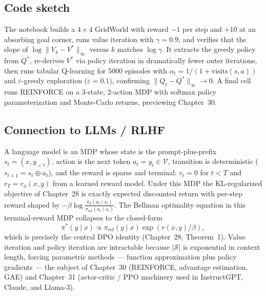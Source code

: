 \subsection*{Code sketch}

The notebook builds a $4{\times}4$ GridWorld with reward $-1$ per step and $+10$ at an absorbing goal corner, runs value iteration with $\gamma = 0.9$, and verifies that the slope of $\log \|V_k - V^*\|_\infty$ versus $k$ matches $\log\gamma$. It extracts the greedy policy from $Q^*$, re-derives $V^*$ via policy iteration in dramatically fewer outer iterations, then runs tabular Q-learning for 5000 episodes with $\alpha_t = 1/(1+\mathrm{visits}(s,a))$ and $\varepsilon$-greedy exploration ($\varepsilon=0.1$), confirming $\|Q_t - Q^*\|_\infty \to 0$. A final cell runs REINFORCE on a 3-state, 2-action MDP with softmax policy parameterization and Monte-Carlo returns, previewing Chapter~30.

\subsection*{Connection to LLMs / RLHF}

A language model is an MDP whose state is the prompt-plus-prefix $s_t = (x, y_{<t})$, action is the next token $a_t = y_t \in \mathcal{V}$, transition is deterministic ($s_{t+1} = s_t \oplus a_t$), and the reward is sparse and terminal: $r_t = 0$ for $t<T$ and $r_T = r_\phi(x,y)$ from a learned reward model. Under this MDP the KL-regularized objective of Chapter~28 is exactly expected discounted return with per-step reward shaped by $-\beta \log\frac{\pi_\theta(a_t\mid s_t)}{\pi_{\mathrm{ref}}(a_t\mid s_t)}$. The Bellman optimality equation in this terminal-reward MDP collapses to the closed-form
\[
\pi^*(y\mid x) \propto \pi_{\mathrm{ref}}(y\mid x)\exp(r(x,y)/\beta),
\]
which is precisely the central DPO identity (Chapter~28, Theorem~1). Value iteration and policy iteration are intractable because $|\mathcal{S}|$ is exponential in context length, forcing parametric methods --- function approximation plus policy gradients --- the subject of Chapter~30 (REINFORCE, advantage estimation, GAE) and Chapter~31 (actor-critic / PPO machinery used in InstructGPT, Claude, and Llama-3).

